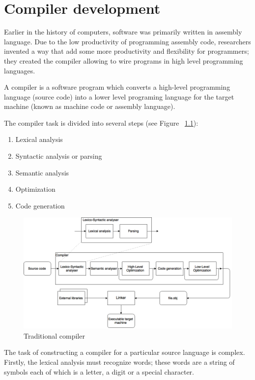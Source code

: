 \documentclass[
  oneside,
  11pt, a4paper,
  footinclude=true,
  headinclude=true,
  cleardoublepage=empty
]{scrbook}
\begin{document}

\chapter{Compiler development}
Earlier in the history of computers, software was primarily written in assembly language. Due to the low productivity of programming assembly code, researchers invented a way that add some more productivity and flexibility for programmers; they created the compiler allowing to wire programs in high level programming languages.

A compiler is a software program which converts a high-level programming language (source code) into a lower level programing language for the target machine (known as machine code or assembly language).

The compiler task is divided into several steps (see Figure ~\ref{fig:compiler}):
\begin{enumerate}
  \item Lexical analysis
  \item Syntactic analysis or parsing
  \item Semantic analysis
  \item Optimization
  \item Code generation
\end{enumerate}

\begin{figure}
\begin{center}
       \includegraphics[width=1\textwidth]{img/compiler.png}
\end{center}
\caption{Traditional compiler}
\label{fig:compiler}
\end{figure}
\newpage
The task of constructing a compiler for a particular source language is complex. Firstly, the lexical analysis must recognize words; these words are a string of symbols each of which is a letter, a digit or a special character.
\end{document}
